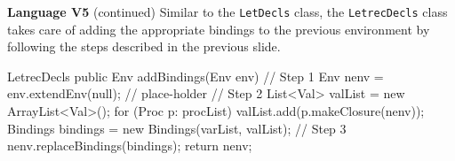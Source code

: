 \begin{minipage}[t]{\sw}
\slidenumber
\LARGE
{\bf Language V5} (continued)\exx
\emm\large{}\exx
\LARGE
Similar to the \verb'LetDecls' class,
the \verb'LetrecDecls' class takes care
of adding the appropriate bindings to the previous environment
by following the steps described in the previous slide.
\Large
\begin{qv}
LetrecDecls
    public Env addBindings(Env env) {
        // Step 1
        Env nenv = env.extendEnv(null); // place-holder
        // Step 2
        List<Val> valList = new ArrayList<Val>();
        for (Proc p: procList)
            valList.add(p.makeClosure(nenv));
        Bindings bindings = new Bindings(varList, valList);
        // Step 3
        nenv.replaceBindings(bindings);
        return nenv;
    }
\end{qv}
\end{minipage}
